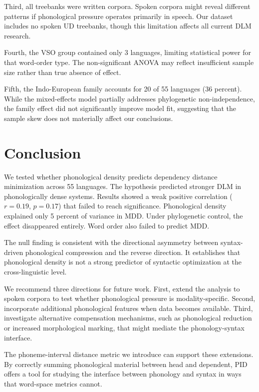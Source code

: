\documentclass[11pt,letterpaper]{article}
\begin{document}
Third, all treebanks were written corpora. Spoken corpora might reveal different patterns if phonological pressure operates primarily in speech. Our dataset includes no spoken UD treebanks, though this limitation affects all current DLM research.

Fourth, the VSO group contained only 3 languages, limiting statistical power for that word-order type. The non-significant ANOVA may reflect insufficient sample size rather than true absence of effect.

Fifth, the Indo-European family accounts for 20 of 55 languages (36 percent). While the mixed-effects model partially addresses phylogenetic non-independence, the family effect did not significantly improve model fit, suggesting that the sample skew does not materially affect our conclusions.

\section{Conclusion}

We tested whether phonological density predicts dependency distance minimization across 55 languages. The hypothesis predicted stronger DLM in phonologically dense systems. Results showed a weak positive correlation ($r = 0.19$, $p = 0.17$) that failed to reach significance. Phonological density explained only 5 percent of variance in MDD. Under phylogenetic control, the effect disappeared entirely. Word order also failed to predict MDD.

The null finding is consistent with the directional asymmetry between syntax-driven phonological compression and the reverse direction. It establishes that phonological density is not a strong predictor of syntactic optimization at the cross-linguistic level.

We recommend three directions for future work. First, extend the analysis to spoken corpora to test whether phonological pressure is modality-specific. Second, incorporate additional phonological features when data becomes available. Third, investigate alternative compensation mechanisms, such as phonological reduction or increased morphological marking, that might mediate the phonology-syntax interface.

The phoneme-interval distance metric we introduce can support these extensions. By correctly summing phonological material between head and dependent, PID offers a tool for studying the interface between phonology and syntax in ways that word-space metrics cannot.



\end{document}
